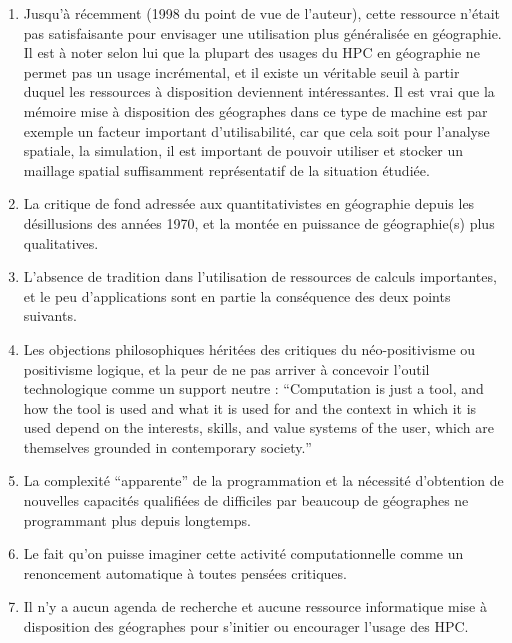 \begin{enumerate}[label=(\alph*),labelindent=\parindent,leftmargin=*]
\item Jusqu’à récemment (1998 du point de vue de l’auteur), cette ressource n’était pas satisfaisante pour envisager une utilisation plus généralisée en géographie. Il est à noter selon lui que la plupart des usages du HPC en géographie ne permet pas un usage incrémental, et il existe un véritable seuil à partir duquel les ressources à disposition deviennent intéressantes. Il est vrai que la mémoire mise à disposition des géographes dans ce type de machine est par exemple un facteur important d’utilisabilité, car que cela soit pour l’analyse spatiale, la simulation, il est important de pouvoir utiliser et stocker un maillage spatial suffisamment représentatif de la situation étudiée.
\item  La critique de fond adressée aux quantitativistes en géographie depuis les désillusions des années 1970, et la montée en puissance de géographie(s) plus qualitatives.
\item L’absence de tradition dans l’utilisation de ressources de calculs importantes, et le peu d’applications sont en partie la conséquence des deux points suivants.
\item  Les objections philosophiques héritées des critiques du néo-positivisme ou positivisme logique, et la peur de ne pas arriver à concevoir l’outil technologique comme un support neutre : \foreignquote{english}{Computation is just a tool, and how the tool is used and what it is used for and the context in which it is used depend on the interests, skills, and value systems of the user, which are themselves grounded in contemporary society.}
\item La complexité \enquote{apparente} de la programmation et la nécessité d’obtention de nouvelles capacités qualifiées de difficiles par beaucoup de géographes ne programmant plus depuis longtemps.
\item Le fait qu’on puisse imaginer cette activité computationnelle comme un renoncement automatique à toutes pensées critiques.
\item Il n’y a aucun agenda de recherche et aucune ressource informatique mise à disposition des géographes pour s’initier ou encourager l’usage des HPC.
\end{enumerate}

